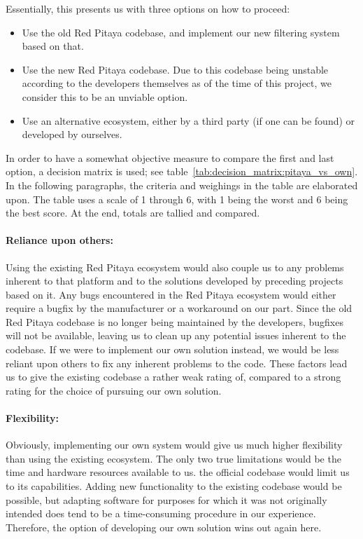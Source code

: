 Essentially, this presents us with three options on how to proceed:
\begin{itemize}
    \item
        Use  the old  Red Pitaya  codebase,  and implement  our new  filtering
        system based  on that.
    \item
        Use the new  Red Pitaya codebase. Due to this  codebase being unstable
        according to the developers themselves as of the time of this project,
        we consider this to be an unviable option.
    \item
        Use an alternative  ecosystem, either by a third party  (if one can be
        found) or developed by ourselves.
\end{itemize}
In   order    to   have    a   somewhat    objective   measure    to   compare
the   first   and   last   option,    a   decision   matrix   is   used;   see
table~\ref{tab:decision_matrix:pitaya_vs_own}. In  the  following  paragraphs,
the criteria and weighings in the  table are elaborated upon. The table uses a
scale of  \num{1} through \num{6},  with \num{1}  being the worst  and \num{6}
being the best score. At the end, totals are tallied and compared.

\paragraph{Reliance  upon others:} Using  the  existing  Red Pitaya  ecosystem
would also  couple us  to any problems  inherent to that  platform and  to the
solutions developed by preceding projects based on it. Any bugs encountered in
the Red Pitaya ecosystem would either  require a bugfix by the manufacturer or
a workaround on our part. Since the old Red Pitaya codebase is no longer being
maintained by  the developers, bugfixes will  not be available, leaving  us to
clean  up  any potential  issues  inherent  to  the  codebase. If we  were  to
implement our  own solution instead, we  would be less reliant  upon others to
fix  any inherent  problems to  the code. These  factors lead  us to  give the
existing codebase a rather weak rating of, compared to a strong rating for the
choice of pursuing our own solution.

\paragraph{Flexibility:} Obviously, implementing our own  system would give us
much higher flexibility  than using the existing ecosystem. The  only two true
limitations would  be the  time and  hardware resources  available to  us. the
official codebase would limit us to its capabilities. Adding new functionality
to the existing codebase would be possible, but adapting software for purposes
for which  it was  not originally  intended does tend  to be  a time-consuming
procedure  in our  experience.  Therefore,  the option  of developing  our own
solution wins out again here.

